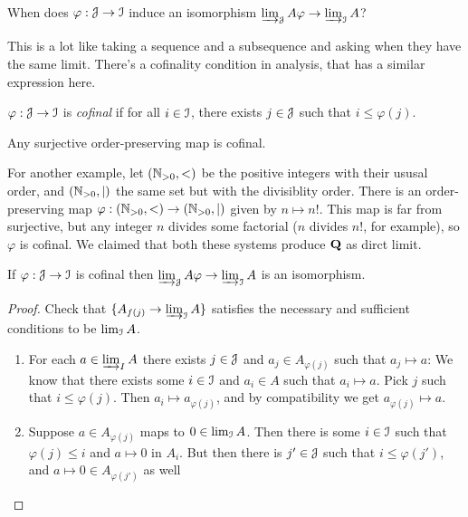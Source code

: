 \begin{question}
When does $\varphi:\mathcal J\to\mathcal I$ induce an isomorphism $\varinjlim_{\mathcal J}A\varphi\to\varinjlim_{\mathcal I}A$?
\end{question}
This is a lot like taking a sequence and a subsequence and asking when they have the same limit. There's a cofinality condition in analysis, that has a similar expression here.
\begin{definition}
$\varphi:\mathcal J\to\mathcal I$ is {\em cofinal} if for all $i\in\mathcal I$, there exists $j\in\mathcal J$ such that $i\leq\varphi(j)$.
\end{definition}
\begin{example}
Any surjective order-preserving map is cofinal. 

For another example, let $(\mathbb N_{>0},<)$ be the positive integers with their
ususal order, and $(\mathbb N_{>0},|)$ the same set but with the divisiblity order.
There is an order-preserving map $\varphi:(\mathbb N_{>0},<)\to(\mathbb N_{>0},|)$ given
by $n\mapsto n!$. This map is far from surjective, but any integer $n$ 
divides some factorial ($n$ divides $n!$, for example), so $\varphi$ is cofinal. 
We claimed that both these systems produce $\mathbf Q$ as dirct limit.
\end{example}
\begin{lemma}
If $\varphi:\mathcal J\to\mathcal I$ is cofinal then $\varinjlim_{\mathcal J}A\varphi\to\varinjlim_{\mathcal I}A$ is an isomorphism.
\end{lemma}
\begin{proof}
Check that $\{A_{f(j)}\to\varinjlim_{\mathcal I}A\}$ satisfies the necessary and sufficient conditions to be $\lim_{\mathcal I}A$.
\begin{enumerate}
\item For each $a\in\varinjlim_{I}A$ there exists $j\in\mathcal J$ and $a_j\in A_{\varphi(j)}$ such that $a_j\mapsto a$: We know that there exists some $i\in\mathcal I$ and $a_i\in A$ such that $a_i\mapsto a$. Pick $j$ such that $i\leq\varphi(j)$. Then $a_i\mapsto a_{\varphi(j)}$, and by compatibility we get $a_{\varphi(j)}\mapsto a$.
\item Suppose $a\in A_{\varphi(j)}$ maps to $0\in\lim_{\mathcal I}A$. Then there is
some $i\in\mathcal I$ such that $\varphi(j)\leq i$ and $a\mapsto0$ in $A_i$. 
But then there is $j'\in\mathcal J$ such that $i\leq\varphi(j')$, and 
$a\mapsto0\in A_{\varphi(j')}$ as well
\end{enumerate}
\end{proof}

